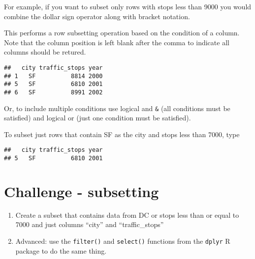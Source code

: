 \documentclass[
]{article}
\newenvironment{Shaded}{\begin{snugshade}}{\end{snugshade}}
\newcommand{\DecValTok}[1]{\textcolor[rgb]{0.00,0.00,0.81}{#1}}
\newcommand{\NormalTok}[1]{#1}
\newcommand{\OtherTok}[1]{\textcolor[rgb]{0.56,0.35,0.01}{#1}}
\newcommand{\SpecialCharTok}[1]{\textcolor[rgb]{0.00,0.00,0.00}{#1}}
\newcommand{\StringTok}[1]{\textcolor[rgb]{0.31,0.60,0.02}{#1}}
\begin{document}
For example, if you want to subset only rows with stops less than 9000
you would combine the dollar sign operator along with bracket notation.

This performs a row subsetting operation based on the condition of a
column. Note that the column position is left blank after the comma to
indicate all columns should be retured.

\begin{Shaded}
\end{Shaded}

\begin{verbatim}
##   city traffic_stops year
## 1   SF          8814 2000
## 5   SF          6810 2001
## 6   SF          8991 2002
\end{verbatim}

Or, to include multiple conditions use logical and \texttt{\&} (all
conditions must be satisfied) and logical or \texttt{\textbar{}} (just
one condition must be satisfied).

To subset just rows that contain SF as the city and stops less than
7000, type

\begin{Shaded}
\end{Shaded}

\begin{verbatim}
##   city traffic_stops year
## 5   SF          6810 2001
\end{verbatim}

\hypertarget{challenge---subsetting}{%
\section{Challenge - subsetting}\label{challenge---subsetting}}

\begin{enumerate}
\def\labelenumi{\arabic{enumi}.}
\item
  Create a subset that contains data from DC or stops less than or equal
  to 7000 and just columns ``city'' and ``traffic\_stops''
\item
  Advanced: use the \texttt{filter()} and \texttt{select()} functions
  from the \texttt{dplyr} R package to do the same thing.
\end{enumerate}
\end{document}
